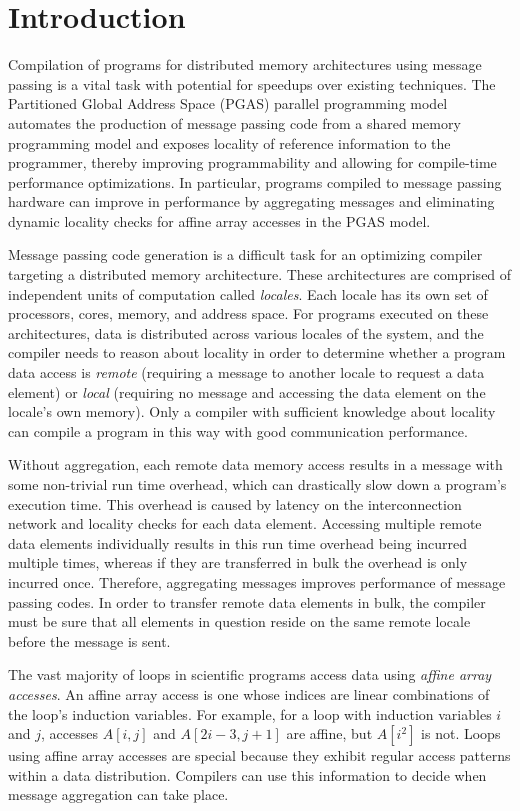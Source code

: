 \section{Introduction}\label{sec:intro} 

Compilation of programs for distributed memory architectures using message passing is a vital task with potential for speedups over existing techniques. The Partitioned Global Address Space (PGAS) parallel programming model automates the production of message passing code from a shared memory programming model and exposes locality of reference information to the programmer, thereby improving programmability and allowing for compile-time performance optimizations. In particular, programs compiled to message passing hardware can improve in performance by aggregating messages and eliminating dynamic locality checks for affine array accesses in the PGAS model. 

Message passing code generation is a difficult task for an optimizing compiler targeting a distributed memory architecture. These architectures are comprised of independent units of computation called \textit{locales}. Each locale has its own set of processors, cores, memory, and address space. For programs executed on these architectures, data is distributed across various locales of the system, and the compiler needs to reason about locality in order to determine whether a program data access is \textit{remote} (requiring a message to another locale to request a data element) or \textit{local} (requiring no message and accessing the data element on the locale's own memory). Only a compiler with sufficient knowledge about locality can compile a program in this way with good communication performance. 

Without aggregation, each remote data memory access results in a message with some non-trivial run time overhead, which can drastically slow down a program's execution time. This overhead is caused by latency on the interconnection network and locality checks for each data element. Accessing multiple remote data elements individually results in this run time overhead being incurred multiple times, whereas if they are transferred in bulk the overhead is only incurred once. Therefore, aggregating messages improves performance of message passing codes. In order to transfer remote data elements in bulk, the compiler must be sure that all elements in question reside on the same remote locale before the message is sent. 

The vast majority of loops in scientific programs access data using \textit{affine array accesses}. An affine array access is one whose indices are linear combinations of the loop's induction variables. For example, for a loop with induction variables $i$ and $j$, accesses $A[i, j]$ and $A[2i-3, j+1]$ are affine, but $A[i^2]$ is not. Loops using affine array accesses are special because they exhibit regular access patterns within a data distribution. Compilers can use this information to decide when message aggregation can take place. 

